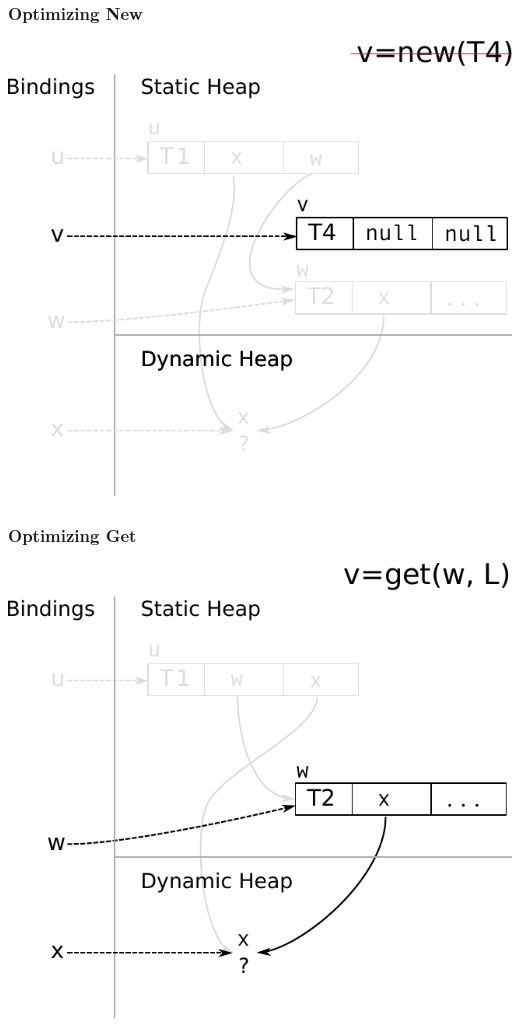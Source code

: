 \documentclass[utf8x]{beamer}
\begin{document}
\begin{frame}[plain]
  \frametitle{Optimizing New}
  \includegraphics[scale=0.8]{figures/opt_new2}
\end{frame}

\begin{frame}[plain]
  \frametitle{Optimizing Get}
  \includegraphics[scale=0.8]{figures/opt_get1}
\end{frame}
\end{document}
